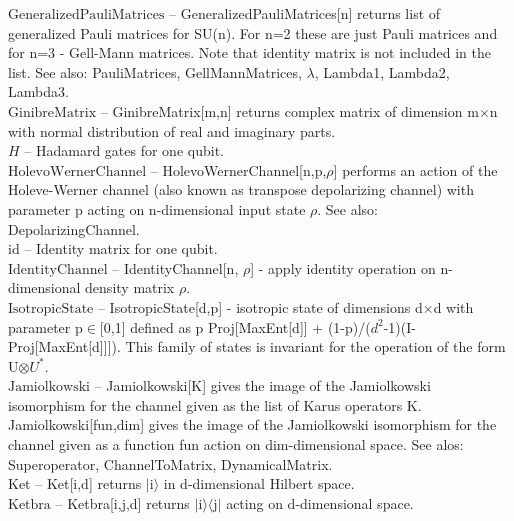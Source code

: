\documentclass[a4paper,10pt]{scrartcl}
\begin{document}
\textbf{$ \text{GeneralizedPauliMatrices} $ }-- GeneralizedPauliMatrices[n] returns list of generalized Pauli matrices for SU(n). For n=2 these are just Pauli matrices and for n=3 - Gell-Mann matrices. Note that identity matrix is not included in the list. See also: PauliMatrices, GellMannMatrices, $\lambda $, Lambda1, Lambda2, Lambda3.$  $\\

\textbf{$ \text{GinibreMatrix} $ }-- GinibreMatrix[m,n] returns complex matrix of dimension m$\times $n with normal distribution of real and imaginary parts.$  $\\

\textbf{$ H $ }-- Hadamard gates for one qubit.$  $\\

\textbf{$ \text{HolevoWernerChannel} $ }-- HolevoWernerChannel[n,p,$\rho $] performs an action of the Holeve-Werner channel (also known as transpose depolarizing channel) with parameter p acting on n-dimensional input state $\rho $. See also: DepolarizingChannel.$  $\\

\textbf{$ \text{id} $ }-- Identity matrix for one qubit.$  $\\

\textbf{$ \text{IdentityChannel} $ }-- IdentityChannel[n, $\rho $] - apply identity operation on n-dimensional density matrix $\rho $.$  $\\

\textbf{$ \text{IsotropicState} $ }-- IsotropicState[d,p] - isotropic state of dimensions d$\times $d with parameter p$\in $[0,1] defined as p Proj[MaxEnt[d]] + (1-p)/($ d^2 $-1)(I-Proj[MaxEnt[d]]]). This family of states is invariant for the operation of the form U$\otimes $$ U^*. $\\

\textbf{$ \text{Jamiolkowski} $ }-- Jamiolkowski[K] gives the image of the Jamiolkowski isomorphism for the channel given as the list of Karus operators K. Jamiolkowski[fun,dim] gives the image of the Jamiolkowski isomorphism for the channel given as a function fun action on dim-dimensional space. See alos: Superoperator, ChannelToMatrix, DynamicalMatrix.$  $\\

\textbf{$ \text{Ket} $ }-- Ket[i,d] returns $|$i$\rangle $ in d-dimensional Hilbert space.$  $\\

\textbf{$ \text{Ketbra} $ }-- Ketbra[i,j,d] returns $|$i$\rangle \langle $j$|$ acting on d-dimensional space.$  $\\
\end{document}
